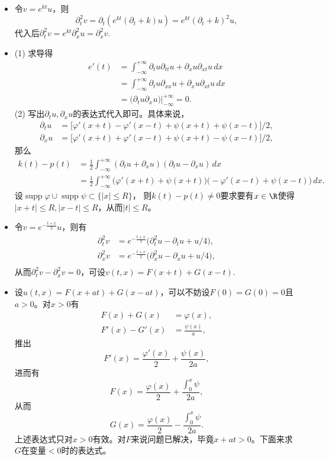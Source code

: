 \begin{itemize}
\item[7.] 令$v=e^{kt}u$，则
\[\partial_t^2 v=\partial_t(e^{kt}(\partial_t+k)u)=e^{kt}(\partial_t+k)^2u,\]
代入后$\partial_t^2 v=e^{kt}\partial_x^2 u=\partial_x^2 v$.

\item[8.] (1) 求导得
\begin{align*}
    e'(t)&=\int_{-\infty}^{+\infty}\partial_tu\partial_{tt}u+\partial_xu\partial_{xt}u\,dx\\
    &=\int_{-\infty}^{+\infty}\partial_tu\partial_{xx}u+\partial_xu\partial_{xt}u\,dx\\
    &=\big(\partial_tu\partial_xu\big)\big|_{-\infty}^{+\infty}=0.
\end{align*}
(2) 写出$\partial_t u,\partial_x u$的表达式代入即可。具体来说，
\begin{align*}
    \partial_tu&=\big[\varphi'(x+t)-\varphi'(x-t)+\psi(x+t)+\psi(x-t)\big]/2,\\
    \partial_xu&=\big[\varphi'(x+t)+\varphi'(x-t)+\psi(x+t)-\psi(x-t)\big]/2,
\end{align*}
那么
\begin{align*}
    k(t)-p(t)&=\frac{1}{2}\int_{-\infty}^{+\infty}(\partial_tu+\partial_xu)(\partial_tu-\partial_xu)\,dx\\
    &=\frac{1}{2}\int_{-\infty}^{+\infty}\big(\varphi'(x+t)+\psi(x+t)\big)\big(\!-\!\varphi'(x-t)+\psi(x-t)\big)\,dx.
\end{align*}
设$\operatorname{supp}\varphi\cup\operatorname{supp}\psi\subset\{|x| \leqslant R\}$，
则$k(t)-p(t)\ne0$要求要有$x\in\R$使得$|x+t| \leqslant R,|x-t| \leqslant R$，从而$|t| \leqslant R$。

\item[9.] 令$v=e^{-\frac{t+x}{2}}u$，则有
\begin{align*}
    \partial_t^2v&=e^{-\frac{t+x}{2}}\big(\partial_t^2u-\partial_tu+u/4\big),\\
    \partial_x^2v&=e^{-\frac{t+x}{2}}\big(\partial_x^2u-\partial_xu+u/4\big),\\
\end{align*}
从而$\partial_t^2v-\partial_x^2v=0$，可设$v(t,x)=F(x+t)+G(x-t)$.

\item[10.] 设$u(t,x)=F(x+at)+G(x-at)$，可以不妨设$F(0)=G(0)=0$且$a>0$。对$x>0$有
\begin{align*}
    F(x)+G(x)&=\varphi(x),\\F'(x)-G'(x)&=\frac{\psi(x)}{a},
\end{align*}
推出
\[F'(x)=\frac{\varphi'(x)}{2}+\frac{\psi(x)}{2a},\]
进而有
\[F(x)=\frac{\varphi(x)}{2}+\frac{\int_0^x\psi}{2a},\]
从而
\[G(x)=\frac{\varphi(x)}{2}-\frac{\int_0^x\psi}{2a}.\]
上述表达式只对$x>0$有效。对$F$来说问题已解决，毕竟$x+at>0$。下面来求$G$在变量$<0$时的表达式。


\end{itemize}
